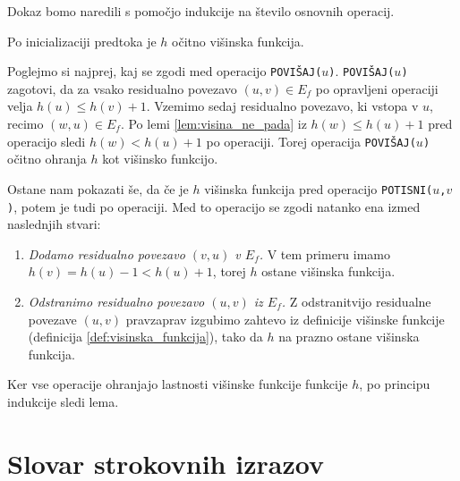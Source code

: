 \documentclass[mat1]{fmfdelo}
\begin{document}
\begin{dokaz}
Dokaz bomo naredili s pomočjo indukcije na število osnovnih operacij.

Po inicializaciji predtoka je $h$ očitno višinska funkcija.

Poglejmo si najprej, kaj se zgodi med operacijo \texttt{POVIŠAJ($u$)}. \texttt{POVIŠAJ($u$)} zagotovi, da za vsako residualno povezavo $(u,v) \in E_f$ po opravljeni operaciji velja $h(u) \leq h(v) +1$. Vzemimo sedaj residualno povezavo, ki vstopa v $u$, recimo $(w,u) \in E_f$. Po lemi \ref{lem:visina_ne_pada} iz $h(w) \leq h(u) + 1$ pred operacijo sledi $h(w) < h(u) + 1$ po operaciji. Torej operacija \texttt{POVIŠAJ($u$)} očitno ohranja $h$ kot višinsko funkcijo.

Ostane nam pokazati še, da če je $h$ višinska funkcija pred operacijo \texttt{POTISNI($u$,$v$)}, potem je tudi po operaciji. Med to operacijo se zgodi natanko ena izmed naslednjih stvari:

\begin{enumerate}
\item \textit{Dodamo residualno povezavo $(v,u)$ v $E_f$.} V tem primeru imamo $h(v) = h(u) - 1 < h(u) + 1$, torej $h$ ostane višinska funkcija.
\item \textit{Odstranimo residualno povezavo $(u,v)$ iz $E_f$.} Z odstranitvijo residualne povezave $(u,v)$ pravzaprav izgubimo zahtevo iz definicije višinske funkcije (definicija \ref{def:visinska_funkcija}), tako da $h$ na prazno ostane višinska funkcija.
\end{enumerate}

Ker vse operacije ohranjajo lastnosti višinske funkcije funkcije $h$, po principu indukcije sledi lema.
\end{dokaz}






























\section*{Slovar strokovnih izrazov}

\geslo{}{}
\geslo{}{}


\begin{thebibliography}{99}


\end{thebibliography}
\end{document}
